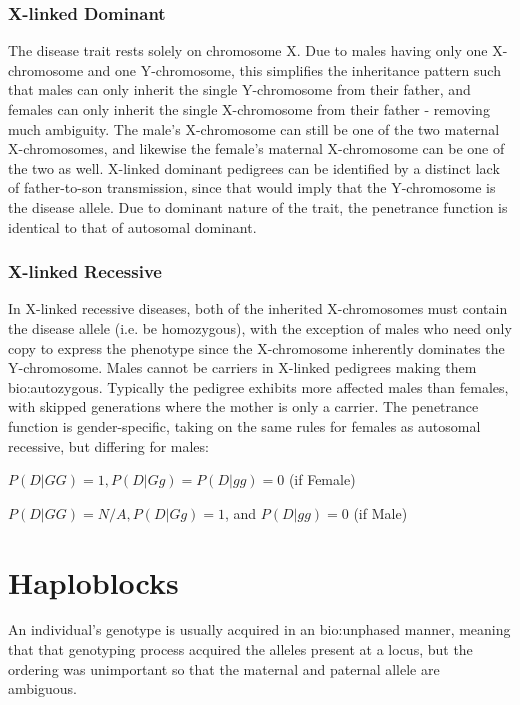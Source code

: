 \subsubsection{X-linked Dominant}

The disease trait rests solely on chromosome X.  Due to males having only one X-chromosome and one Y-chromosome, this simplifies the inheritance pattern such that males can only inherit the single Y-chromosome from their father, and females can only inherit the single  X-chromosome from their father - removing much ambiguity. The male's X-chromosome can still be one of the two maternal X-chromosomes, and likewise the female's maternal X-chromosome can be one of the two as well.  X-linked dominant pedigrees can be identified by a distinct lack of father-to-son transmission, since that would imply that the Y-chromosome is the disease allele. Due to dominant nature of the trait, the penetrance function is identical to that of autosomal dominant.

\subsubsection{X-linked Recessive}

\label{ref:back:xlinkrec}

In X-linked recessive diseases, both of the inherited X-chromosomes must contain the disease allele (i.e. be homozygous), with the exception of males who need only copy to express the phenotype since the X-chromosome inherently dominates the Y-chromosome.  Males cannot be carriers in X-linked pedigrees making them \gls{bio:autozygous}.
Typically the pedigree exhibits more affected males than females, with skipped generations where the mother is only a carrier. 
The penetrance function is gender-specific, taking on the same rules for females as autosomal recessive, but differing for males:

\begin{description}
\item{\hfill \(P(D|GG)=1, P(D|Gg) = P(D|gg)=0\) \hfill(if Female) }
\item{\hfill \(P(D|GG)=N/A, P(D|Gg)=1\), and \(P(D|gg)=0\) \hfill (if Male)}
\end{description}


\section{Haploblocks}

An individual's genotype is usually acquired in an \gls{bio:unphased} manner, meaning that that genotyping process acquired the alleles present at a locus, but the ordering was unimportant so that the maternal and paternal allele are ambiguous.

